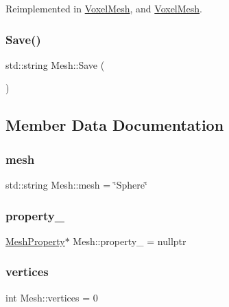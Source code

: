 Reimplemented in \mbox{\hyperlink{class_voxel_mesh_ae86555f2df9a4ba3b21b62a4bd26b591}{Voxel\+Mesh}}, and \mbox{\hyperlink{class_voxel_mesh_ae86555f2df9a4ba3b21b62a4bd26b591}{Voxel\+Mesh}}.

\mbox{\label{class_mesh_a2d249389fd92b8f6a2d66ac0ab644d6c}} 
\subsubsection{\texorpdfstring{Save()}{Save()}}
{\footnotesize\ttfamily std\+::string Mesh\+::\+Save (\begin{DoxyParamCaption}{ }\end{DoxyParamCaption})}



\subsection{Member Data Documentation}
\mbox{\label{class_mesh_a5878a5aeed5faa444201d58f57ef394a}} 
\subsubsection{\texorpdfstring{mesh}{mesh}}
{\footnotesize\ttfamily std\+::string Mesh\+::mesh = \char`\"{}Sphere\char`\"{}}

\mbox{\label{class_mesh_a25f284c2edef151fecad1ee4fb9aefd4}} 
\subsubsection{\texorpdfstring{property\_}{property\_}}
{\footnotesize\ttfamily \mbox{\hyperlink{class_mesh_property}{Mesh\+Property}}$\ast$ Mesh\+::property\+\_\+ = nullptr\hspace{0.3cm}{\ttfamily [protected]}}

\mbox{\label{class_mesh_a922390e7245b484961cf4f6e9e37c9dd}} 
\subsubsection{\texorpdfstring{vertices}{vertices}}
{\footnotesize\ttfamily int Mesh\+::vertices = 0}



